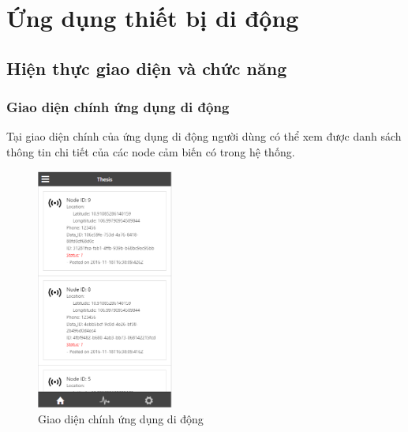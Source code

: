 \section{Ứng dụng thiết bị di động}
\subsection{Hiện thực giao diện và chức năng}
\subsubsection*{Giao diện chính ứng dụng di động}
Tại giao diện chính của ứng dụng di động người dùng có thể xem được danh sách thông tin chi tiết của các node cảm biến có trong hệ thống.
\begin{center}
\begin{figure}[H]
\centering    
\includegraphics[width=0.4\textwidth]{app_main}
\caption[Giao diện chính ứng dụng di động]{Giao diện chính ứng dụng di động}
\label{fig:app_main}
\end{figure}
\end{center}


